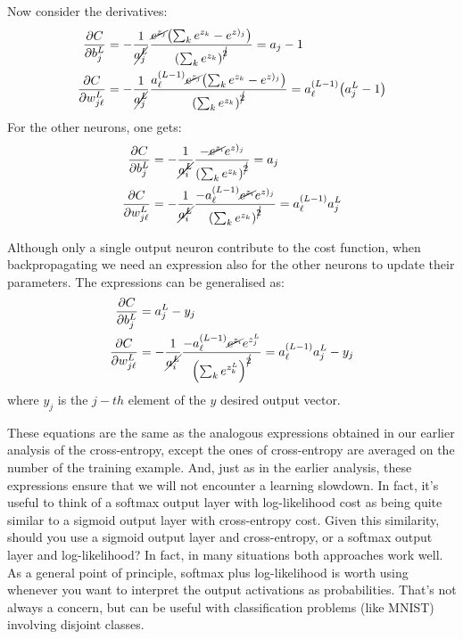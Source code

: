 Now consider the derivatives:
\begin{equation}
\begin{aligned}
\frac{\partial C}{\partial b_j^L} &= -\frac{1}{\cancel{a_j^L}}\frac{\cancel{e^{z_j}}\br{\sum_k e^{z_k}-e^{z)_j}}}{\br{\sum_k e^{z_k}}^{\cancel 2}} = a_j -1\\
\frac{\partial C}{\partial w_{j\ell}^L} &= -\frac{1}{\cancel{a_j^L}}\frac{a_\ell^{(L-1)}\cancel{e^{z_j}}\br{\sum_k e^{z_k}-e^{z)_j}}}{\br{\sum_k e^{z_k}}^{\cancel {2}}} = a_\ell^{(L-1)} \br{a_j^L -1}\\
\end{aligned}
\end{equation}
For the other neurons, one gets:
\begin{equation}
\begin{aligned}
\frac{\partial C}{\partial b_j^L} &= -\frac{1}{\cancel{a_i^L}}\frac{-\cancel{e^{z_i}} e^{z)_j}}{\left(\sum_k e^{z_k}\right)^{\cancel 2}} = a_j \\
\frac{\partial C}{\partial w_{j\ell}^L} &= -\frac{1}{\cancel{a_i^L}}\frac{-a_\ell^{(L-1)}\cancel{e^{z_i}}e^{z)_j}}{\left(\sum_k e^{z_k}\right)^{\cancel {2}}} = a_\ell^{(L-1)} a_j^L\\
\end{aligned}
\end{equation}

Although only a single output neuron contribute to the cost function, when backpropagating we need an expression also for the other neurons to update their parameters. The expressions can be generalised as:
\begin{equation}
\begin{aligned}
\frac{\partial C}{\partial b_j^L} &= a_j^L-y_j \\
\frac{\partial C}{\partial w_{j\ell}^L} &= -\frac{1}{\cancel{a_i^L}}\frac{-a_\ell^{(L-1)}\cancel{e^{z_i}}e^{z^L_j}}{\left(\sum_k e^{z^L_k}\right)^{\cancel {2}}} = a_\ell^{(L-1)} a_j^L-y_j\\
\end{aligned}
\end{equation}
where $y_j$ is the $j-th$ element of the $y$ desired output vector.

These equations are the same as the analogous expressions obtained in our earlier analysis of the cross-entropy, except the ones of cross-entropy are averaged on the number of the training example.  And, just as in the earlier analysis, these expressions ensure that we will not encounter a learning slowdown. In fact, it's useful to think of a softmax output layer with log-likelihood cost as being quite similar to a sigmoid output layer with cross-entropy cost. Given this similarity, should you use a sigmoid output layer and cross-entropy, or a softmax output layer and log-likelihood? In fact, in many situations both approaches work well. As a general point of principle, softmax plus log-likelihood is worth using whenever you want to interpret the output activations as probabilities. That's not always a concern, but can be useful with classification problems (like MNIST) involving disjoint classes.

